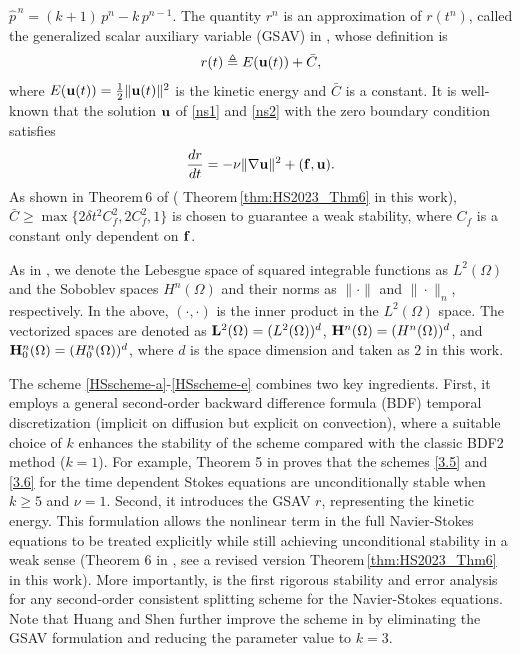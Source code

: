 \documentclass{article}
\theoremstyle{definition}                   %
\begin{document}
$\hat{p}^{\,n} = (k+1)\,p^{n} - k\,p^{n-1}$. 
The quantity $r^n$ is an approximation of $r(t^n)$, called the generalized scalar auxiliary variable (GSAV) in \cite{HuangShen2023}, whose definition is
\setcounter{equation}{4}
\begin{align}
\label{def_SAV}
r(t) \triangleq E({\bf u}(t))+\bar{C},
\end{align}
where $E({\bf u}(t))=\frac12\|{\bf u}(t)\|^2$ is the kinetic energy and $\bar{C}$ is a constant.  
It is well-known that the solution ${\bf u}$ of \eqref{ns1} and \eqref{ns2} with the zero boundary condition satisfies
\begin{equation}
\frac{dr}{dt} = -\nu \| \nabla {\bf u} \|^2 + ({\bf f}, {\bf u}).
\end{equation}
As shown in Theorem\,6 of \cite{HuangShen2023}( Theorem\,\ref{thm:HS2023_Thm6} in this work), $\bar{C}\ge \max\{2\delta t^2 C^2_f, 2C^2_f ,1\}$ is chosen to guarantee a weak stability, where $C_f$ is a constant only dependent on ${\bf f}$.  



As in \cite{HuangShen2023}, we denote the Lebesgue space of squared integrable functions as $L^2(\Omega)$ and the Soboblev spaces $H^n(\Omega)$ and their norms as $\|\cdot \|$ and $\|\cdot\|_n$, respectively. In the above,  $(\cdot, \cdot)$ is the inner product in the $L^2(\Omega)$ space. The vectorized spaces are denoted as  
${\bf L}^2(\Omega)=(L^2(\Omega))^d$, 
${\bf H}^n(\Omega)=(H^n(\Omega))^d$,
and 
${\bf H}^n_0(\Omega)=(H^n_0(\Omega))^d$,
where $d$ is the space dimension and taken as $2$ in this work.



The scheme \eqref{HSscheme-a}-\eqref{HSscheme-e} combines two key ingredients. First, it employs a general second-order backward difference formula (BDF) temporal discretization (implicit on diffusion but explicit on convection), where a suitable choice of 
$k$ enhances the stability of the scheme compared with the classic BDF2 method ($k=1$). For example, Theorem 5 in \cite{HuangShen2023} proves that the schemes \eqref{3.5} and \eqref{3.6} for the time dependent Stokes equations are unconditionally stable when $k\ge 5$ and $\nu=1$.
Second, it introduces the GSAV $r$, representing the kinetic energy. This formulation allows the nonlinear term in the full Navier-Stokes equations to be treated explicitly while still achieving unconditional stability in a weak sense (Theorem 6 in \cite{HuangShen2023}, see a revised version Theorem\,\ref{thm:HS2023_Thm6} in this work). More importantly, \cite{HuangShen2023} is the first rigorous stability and error analysis for
any second-order consistent splitting scheme for the Navier-Stokes equations.
Note that Huang and Shen further improve the scheme in \cite{HuangShen2025} by eliminating the GSAV formulation and reducing the parameter value to $k=3$. 
\end{document}
